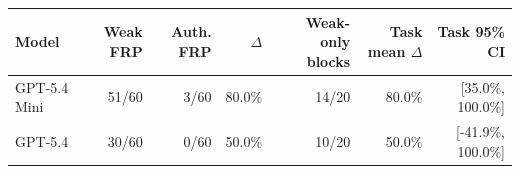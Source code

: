\begin{tabular}{lrrrrrr}
\toprule
Model & Weak FRP & Auth. FRP & $\Delta$ & Weak-only blocks & Task mean $\Delta$ & Task 95\% CI \\
\midrule
GPT-5.4 Mini & 51/60 & 3/60 & 80.0\% & 14/20 & 80.0\% & [35.0\%, 100.0\%] \\
GPT-5.4 & 30/60 & 0/60 & 50.0\% & 10/20 & 50.0\% & [-41.9\%, 100.0\%] \\
\bottomrule
\end{tabular}
